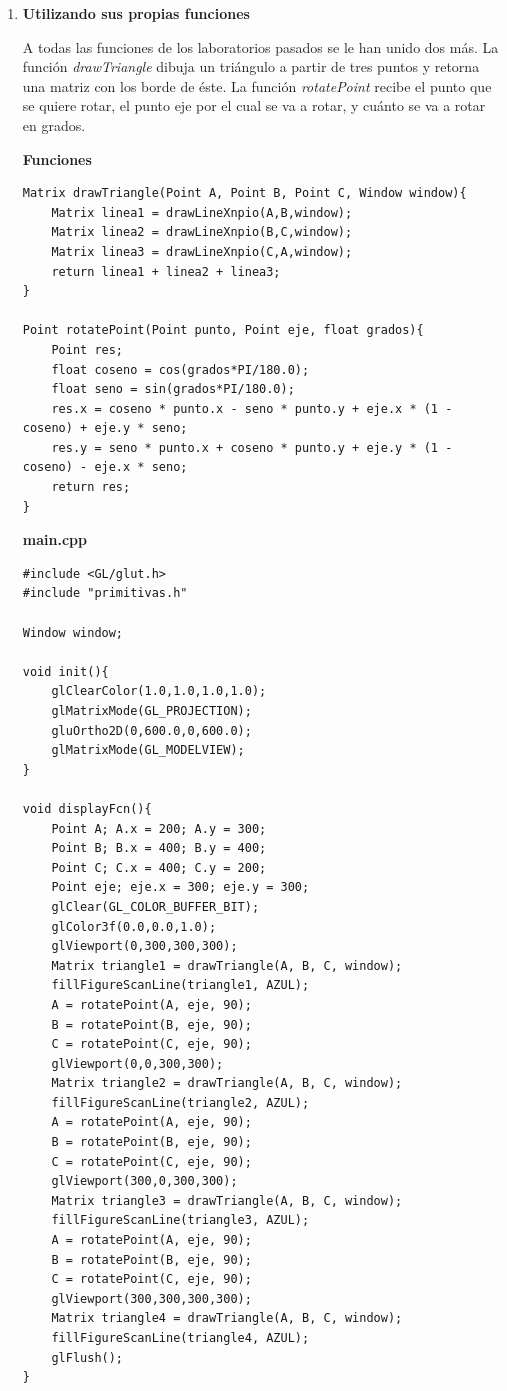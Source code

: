 \documentclass[a4paper,12pt]{article}
\begin{document}
\begin{enumerate}
\begin{enumerate}
  \item \textbf{Utilizando sus propias funciones}
  
  A todas las funciones de los laboratorios pasados se le han unido dos más. La función \textit{drawTriangle} dibuja un triángulo a partir de tres puntos
  y retorna una matriz con los borde de éste. La función \textit{rotatePoint} recibe el punto que se quiere rotar, el punto eje por el cual se va a rotar, y 
  cuánto se va a rotar en grados.
  
  \textbf{Funciones}
  
  \begin{lstlisting}
Matrix drawTriangle(Point A, Point B, Point C, Window window){
    Matrix linea1 = drawLineXnpio(A,B,window);
    Matrix linea2 = drawLineXnpio(B,C,window);
    Matrix linea3 = drawLineXnpio(C,A,window);
    return linea1 + linea2 + linea3;
}

Point rotatePoint(Point punto, Point eje, float grados){
    Point res;
    float coseno = cos(grados*PI/180.0);
    float seno = sin(grados*PI/180.0);
    res.x = coseno * punto.x - seno * punto.y + eje.x * (1 - coseno) + eje.y * seno;
    res.y = seno * punto.x + coseno * punto.y + eje.y * (1 - coseno) - eje.x * seno;
    return res;
}
  \end{lstlisting}
  
  \textbf{main.cpp}
  
  \begin{lstlisting}
#include <GL/glut.h>
#include "primitivas.h"

Window window;

void init(){
	glClearColor(1.0,1.0,1.0,1.0);
	glMatrixMode(GL_PROJECTION);
	gluOrtho2D(0,600.0,0,600.0);
	glMatrixMode(GL_MODELVIEW);
}

void displayFcn(){
	Point A; A.x = 200; A.y = 300;
	Point B; B.x = 400; B.y = 400;
	Point C; C.x = 400; C.y = 200;
	Point eje; eje.x = 300; eje.y = 300;
	glClear(GL_COLOR_BUFFER_BIT);
	glColor3f(0.0,0.0,1.0);
	glViewport(0,300,300,300);
	Matrix triangle1 = drawTriangle(A, B, C, window);
	fillFigureScanLine(triangle1, AZUL);
	A = rotatePoint(A, eje, 90);
	B = rotatePoint(B, eje, 90);
	C = rotatePoint(C, eje, 90);
	glViewport(0,0,300,300);
	Matrix triangle2 = drawTriangle(A, B, C, window);
	fillFigureScanLine(triangle2, AZUL);
	A = rotatePoint(A, eje, 90);
	B = rotatePoint(B, eje, 90);
	C = rotatePoint(C, eje, 90);
	glViewport(300,0,300,300);
	Matrix triangle3 = drawTriangle(A, B, C, window);
	fillFigureScanLine(triangle3, AZUL);
	A = rotatePoint(A, eje, 90);
	B = rotatePoint(B, eje, 90);
	C = rotatePoint(C, eje, 90);
	glViewport(300,300,300,300);
	Matrix triangle4 = drawTriangle(A, B, C, window);
	fillFigureScanLine(triangle4, AZUL);
	glFlush();
}


\end{lstlisting}
\end{enumerate}
\end{enumerate}
\end{document}
